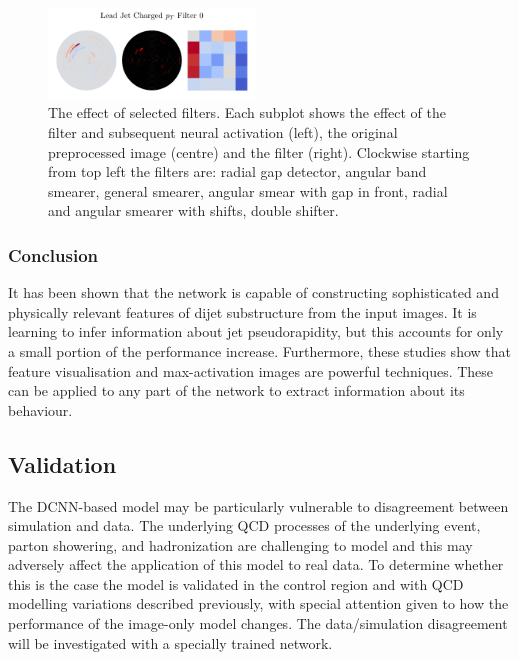 \begin{figure}[h!]
\begin{center}
        \includegraphics[width=0.49\textwidth]{figures/event_selection/ggh_firstconv_0_0.pdf}
    \end{center}
    \caption{The effect of selected filters. Each subplot shows the effect of the filter and subsequent neural activation (left), the original preprocessed image (centre) and the filter (right).
             Clockwise starting from top left the filters are: radial gap detector, angular band smearer, general smearer, angular smear with gap in front, radial and angular smearer with shifts, double shifter.}
    \label{fig:event_categorisation:filter_action}
\end{figure}



\subsubsection{Conclusion}
It has been shown that the network is capable of constructing sophisticated and physically relevant features of dijet substructure from the input images. 
It is learning to infer information about jet pseudorapidity, but this accounts for only a small portion of the performance increase. 
Furthermore, these studies show that feature visualisation and max-activation images are powerful techniques. 
These can be applied to any part of the network to extract information about its behaviour.  











\subsection{Validation}
The DCNN-based model may be particularly vulnerable to disagreement between simulation and data. The underlying QCD processes of the underlying event, parton showering, and hadronization are challenging to model and this may adversely affect the application of this model to real data. To determine whether this is the case the model is validated in the \Zee control region and with QCD modelling variations described previously, with special attention given to how the performance of the image-only model changes.
The \Zee data/simulation disagreement will be investigated with a specially trained network. 

